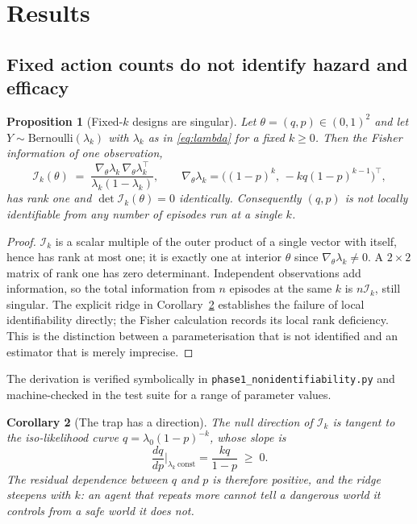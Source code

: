 \documentclass[11pt]{article}
\newtheorem{proposition}{Proposition}
\newtheorem{corollary}[proposition]{Corollary}
\newcommand{\lamk}{\lambda_k}
\newcommand{\Ifisher}{\mathcal{I}}
\begin{document}
\section{Results}

\subsection{Fixed action counts do not identify hazard and efficacy}
\label{sec:theorem}

\begin{proposition}[Fixed-$k$ designs are singular]
\label{prop:rank1}
Let $\theta=(q,p)\in(0,1)^2$ and let $Y\sim\mathrm{Bernoulli}(\lamk)$ with $\lamk$
as in \eqref{eq:lambda} for a fixed $k\ge 0$. Then the Fisher information of one
observation,
\begin{equation}
\Ifisher_k(\theta) \;=\;
\frac{\nabla_\theta \lamk \, \nabla_\theta \lamk^{\top}}{\lamk(1-\lamk)},
\qquad
\nabla_\theta \lamk =
\big((1-p)^{k},\,-kq(1-p)^{k-1}\big)^{\top},
\label{eq:fisher}
\end{equation}
has rank one and $\det \Ifisher_k(\theta) = 0$ identically. Consequently $(q,p)$
is not locally identifiable from any number of episodes run at a single $k$.
\end{proposition}

\begin{proof}
$\Ifisher_k$ is a scalar multiple of the outer product of a single vector with
itself, hence has rank at most one; it is exactly one at interior $\theta$ since
$\nabla_\theta\lamk \neq 0$. A $2\times2$ matrix of rank one has zero
determinant. Independent observations add information, so the total information
from $n$ episodes at the same $k$ is $n\Ifisher_k$, still singular. The explicit
ridge in Corollary~\ref{cor:ridge} establishes the failure of local
identifiability directly; the Fisher calculation records its local rank
deficiency. This is the distinction between a parameterisation that is not
identified and an estimator that is merely imprecise.
\end{proof}

The derivation is verified symbolically in \texttt{phase1\_nonidentifiability.py}
and machine-checked in the test suite for a range of parameter values.

\begin{corollary}[The trap has a direction]
\label{cor:ridge}
The null direction of $\Ifisher_k$ is tangent to the iso-likelihood curve
$q = \lambda_0 (1-p)^{-k}$, whose slope is
\begin{equation}
\frac{dq}{dp}\bigg|_{\lamk\ \mathrm{const}} = \frac{kq}{1-p} \;\ge\; 0 .
\label{eq:slope}
\end{equation}
The residual dependence between $q$ and $p$ is therefore \emph{positive}, and the
ridge steepens with $k$: an agent that repeats more cannot tell a dangerous world
it controls from a safe world it does not.
\end{corollary}
\end{document}
